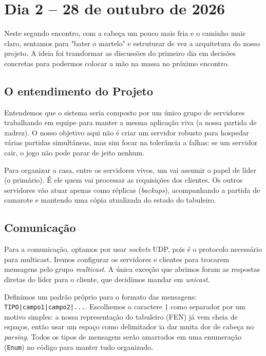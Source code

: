 {}
\section*{Dia 2 -- 28 de outubro de 2026}
\label{dia:2}

Neste segundo encontro, com a cabeça um pouco mais fria e o caminho mais claro, sentamos para "bater o martelo" e estruturar de vez a arquitetura do nosso projeto. A ideia foi transformar as discussões do primeiro dia em decisões concretas para podermos colocar a mão na massa no próximo encontro.

\subsection*{O entendimento do Projeto}
Entendemos que o sistema seria composto por um único grupo de servidores trabalhando em equipe para manter a mesma aplicação viva (a nossa partida de xadrez). O nosso objetivo aqui não é criar um servidor robusto para hospedar várias partidas simultâneas, mas sim focar na tolerância a falhas: se um servidor cair, o jogo não pode parar de jeito nenhum.

Para organizar a casa, entre os servidores vivos, um vai assumir o papel de líder (o primário). É ele quem vai processar as requisições dos clientes. Os outros servidores vão atuar apenas como réplicas (\textit{backups}), acompanhando a partida de camarote e mantendo uma cópia atualizada do estado do tabuleiro.


\subsection*{Comunicação}
Para a comunicação, optamos por usar \textit{sockets} UDP, pois é o protocolo necessário para multicast. Iremos configurar os servidores e clientes para trocarem mensagens pelo grupo \textit{multicast}. A única exceção que abrimos foram as respostas diretas do líder para o cliente, que decidimos mandar em \textit{unicast}.

Definimos um padrão próprio para o formato das mensagens: \texttt{TIPO|campo1|campo2|...}. Escolhemos o caractere \texttt{|} como separador por um motivo simples: a nossa representação do tabuleiro (FEN) já vem cheia de espaços, então usar um espaço como delimitador ia dar muita dor de cabeça no \textit{parsing}. Todos os tipos de mensagem serão amarrados em uma enumeração (\texttt{Enum}) no código para manter tudo organizado.


